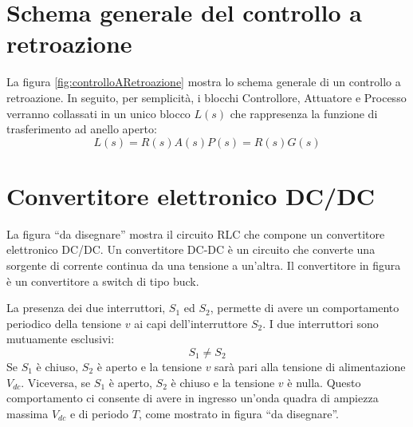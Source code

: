\documentclass[a4paper]{report}
\begin{document}
\section{Schema generale del controllo a retroazione}

La figura \ref{fig:controlloARetroazione} mostra lo schema generale di
un controllo a retroazione. In seguito, per semplicit\`a, i blocchi
Controllore, Attuatore e Processo verranno collassati in un unico
blocco $L(s)$ che rappresenza la funzione di trasferimento ad anello
aperto:
\[
L(s) = R(s) A(s) P(s) = R(s) G(s)
\]

\section{Convertitore elettronico DC/DC}
La figura ``da disegnare'' mostra il circuito RLC che compone un
convertitore elettronico DC/DC. Un convertitore DC-DC \`e un circuito
che converte una sorgente di corrente continua da una tensione a
un'altra. Il convertitore in figura \`e un convertitore a switch di
tipo buck.

La presenza dei due interruttori, $S_1$ ed $S_2$, permette di avere un
comportamento periodico della tensione $v$ ai capi dell'interruttore
$S_2$. I due interruttori sono mutuamente esclusivi:
\[
S_1 \neq S_2
\]
Se $S_1$ \`e chiuso, $S_2$ \`e aperto e la tensione $v$ sar\`a pari
alla tensione di alimentazione $V_{dc}$. Viceversa, se $S_1$ \`e aperto, $S_2$
\`e chiuso e la tensione $v$ \`e nulla. Questo comportamento ci
consente di avere in ingresso un'onda quadra di ampiezza massima
$V_{dc}$ e di periodo $T$, come mostrato in figura ``da disegnare''.
\end{document}
